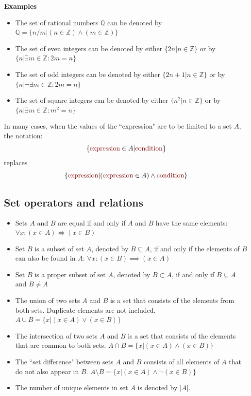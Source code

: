 \documentclass{article}
\newcommand{\dr}[1]{\textcolor{dark_red}{#1}}
\begin{document}
\textbf{Examples}
\begin{itemize}
\item The set of rational numbers \(\mathbb{Q}\) can be denoted by \(\mathbb{Q} = \{n/m | (n \in \mathbb{Z}) \wedge (m \in \mathbb{Z})\}\)
\item The set of even integers can be denoted by either \(\{2n | n \in \mathbb{Z}\}\) or by \(\{n | \exists m \in \mathbb{Z} : 2m = n\}\)
\item The set of odd integers can be denoted by either \(\{2n+1 | n \in \mathbb{Z}\}\) or by \(\{n | \neg\exists m \in \mathbb{Z} : 2m = n\}\)
\item The set of square integers can be denoted by either \(\{n^2 | n \in \mathbb{Z}\}\) or by \(\{n | \exists m \in \mathbb{Z} : m^2 = n\}\)
\end{itemize}

In many cases, when the values of the ``\dr{expression}" are to be limited to a set \(A\), the notation:
\[\{\dr{\text{expression}} \in A|\dr{\text{condition}}\}\]
replaces 
\[\{\dr{\text{expression}}| (\dr{\text{expression}} \in A) \wedge \dr{\text{condition}}\}\]




\subsection{Set operators and relations}

\begin{itemize}
\item Sets \(A\) and \(B\) are equal if and only if \(A\) and \(B\) have the same elements: \(\forall x : (x \in A) \iff (x \in B)\)
\item Set \(B\) is a subset of set \(A\), denoted by \(B \subseteq A\), if and only if the elements of \(B\) can also be found in \(A\): \(\forall x : (x \in B) \implies (x \in A)\)
\item Set \(B\) is a proper subset of set \(A\), denoted by \(B \subset A\), if and only if \(B \subseteq A\) and \(B \neq A\)
\item The union of two sets \(A\) and \(B\) is a set that consists of the elements from both sets. Duplicate elements are not included. \(A \cup B = \{x | (x \in A) \vee (x \in B)\}\)
\item The intersection of two sets \(A\) and \(B\) is a set that consists of the elements that are common to both sets. \(A \cap B = \{x | (x \in A) \wedge (x \in B)\}\)
\item The ``set difference" between sets \(A\) and \(B\) consists of all elements of \(A\) that do not also appear in \(B\). \(A \setminus B = \{x | (x \in A) \wedge \neg(x \in B)\}\)
\item The number of unique elements in set \(A\) is denoted by \(|A|\).
\end{itemize}
\end{document}
